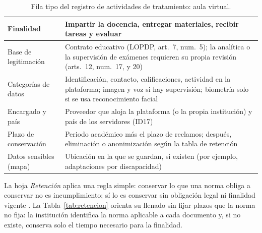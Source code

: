 \begin{table}[htbp]
\centering
\caption{Fila tipo del registro de actividades de tratamiento: aula virtual.}
\label{tab:rat_aula}
\scriptsize
\renewcommand{\arraystretch}{1.15}
\begin{tabularx}{\textwidth}{|>{\raggedright\arraybackslash}p{3.0cm}|L|}
  \hline
    Finalidad & Impartir la docencia, entregar materiales, recibir tareas y evaluar \\ \hline
  Base de legitimación & Contrato educativo (LOPDP, art.~7, num.~5); la analítica o la supervisión de exámenes requieren su propia revisión (arts.~12, num.~17, y 20) \\ \hline
  Categorías de datos & Identificación, contacto, calificaciones, actividad en la plataforma; imagen y voz si hay supervisión; biometría solo si se usa reconocimiento facial \\ \hline
  Encargado y país & Proveedor que aloja la plataforma (o la propia institución) y país de los servidores (ID17) \\ \hline
  Plazo de conservación & Periodo académico más el plazo de reclamos; después, eliminación o anonimización según la tabla de retención \\ \hline
  Datos sensibles (mapa) & Ubicación en la que se guardan, si existen (por ejemplo, adaptaciones por discapacidad) \\ \hline
\end{tabularx}
\raggedright
{}
\end{table}

La hoja \textit{Retención} aplica una regla simple: conservar lo que una norma obliga a conservar no es incumplimiento; sí lo es conservar sin obligación legal ni finalidad vigente \cite[arts.~10, lit.~i, y 15]{lopdp2021}. La Tabla~\ref{tab:retencion} orienta su llenado sin fijar plazos que la norma no fija: la institución identifica la norma aplicable a cada documento y, si no existe, conserva solo el tiempo necesario para la finalidad.

